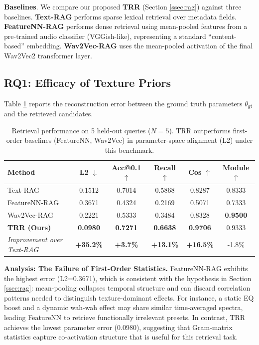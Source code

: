 \documentclass{article}
\begin{document}
	\textbf{Baselines}. We compare our proposed \textbf{TRR} (Section \ref{ssec:rag}) against three baselines. \textbf{Text-RAG} performs sparse lexical retrieval over metadata fields. \textbf{FeatureNN-RAG} performs dense retrieval using mean-pooled features from a pre-trained audio classifier (VGGish-like), representing a standard ``content-based'' embedding. \textbf{Wav2Vec-RAG} uses the mean-pooled activation of the final Wav2Vec2 transformer layer.

\subsection{RQ1: Efficacy of Texture Priors}

Table \ref{tab:main_results} reports the reconstruction error between the ground truth parameters $\theta_{\text{gt}}$ and the retrieved candidates.

\begin{table}[h]
	\centering
	\caption{Retrieval performance on 5 held-out queries ($N=5$). TRR outperforms first-order baselines (FeatureNN, Wav2Vec) in parameter-space alignment (L2) under this benchmark.}
	\label{tab:main_results}
	\begin{tabular}{lccccc}
		\toprule
		\textbf{Method}             & \textbf{L2} $\downarrow$ & \textbf{Acc@0.1} $\uparrow$ & \textbf{Recall} $\uparrow$ & \textbf{Cos} $\uparrow$ & \textbf{Module} $\uparrow$ \\
		\midrule
		Text-RAG                    & 0.1512                     & 0.7014           & 0.5868       & 0.8287       & 0.8333                 \\
		FeatureNN-RAG               & 0.3671                     & 0.4324           & 0.2169       & 0.5071       & 0.7333                 \\
		Wav2Vec-RAG                 & 0.2221                     & 0.5333           & 0.3484       & 0.8328       & \textbf{0.9500}        \\
		\textbf{TRR (Ours)}         & \textbf{0.0980}            & \textbf{0.7271}  & \textbf{0.6638} & \textbf{0.9706} & 0.9333                 \\
		\midrule
		\textit{Improvement over Text-RAG} & \textbf{+35.2\%} & \textbf{+3.7\%} & \textbf{+13.1\%} & \textbf{+16.5\%} & -1.8\% \\
		\bottomrule
	\end{tabular}
\end{table}

\textbf{Analysis: The Failure of First-Order Statistics.}
FeatureNN-RAG exhibits the highest error (L2=0.3671), which is consistent with the hypothesis in Section \ref{ssec:rag}: mean-pooling collapses temporal structure and can discard correlation patterns needed to distinguish texture-dominant effects. For instance, a static EQ boost and a dynamic wah-wah effect may share similar time-averaged spectra, leading FeatureNN to retrieve functionally irrelevant presets.
In contrast, TRR achieves the lowest parameter error (0.0980), suggesting that Gram-matrix statistics capture co-activation structure that is useful for this retrieval task.
\end{document}
